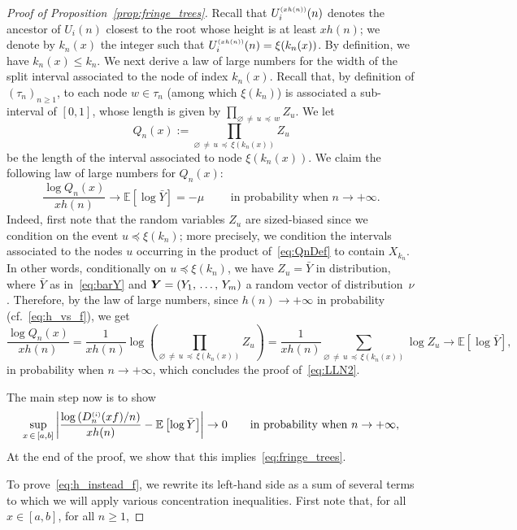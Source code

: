 \documentclass[AHL,Unicode,longabstracts,published]{cedram}
\newcommand{\bs}{\ensuremath{\boldsymbol}}
\newcommand{\sss}{\ensuremath{\scriptscriptstyle}}
\newcommand{\bbE}{\mathbb{E}}
\begin{document}
\begin{proof}[Proof of Proposition~\ref{prop:fringe_trees}]
Recall that $U_i^{\sss (xh(n))}(n)$ denotes the ancestor of $U_i(n)$ closest to the root whose height is at least $xh(n)$; we denote by $k_n(x)$ the integer such that $U_i^{\sss (xh(n))}(n) = \xi(k_n(x))$. By definition, we have $k_n(x)\leq k_n$. We next derive a law of large numbers for the width of the split interval associated to the node of index $k_n(x)$. Recall that, by definition of $(\tau_n)_{n\geq 1}$, to each node $w \in \tau_n$ (among which $\xi(k_n)$) is associated a sub-interval of $[0,1]$, whose length is given by $\prod_{\varnothing\,\neq\,u\,\preccurlyeq\,w} Z_u.$ We let
\begin{equation}\label{eq:QnDef}
Q_n(x) := \prod_{\varnothing\,\neq\,u\,\preccurlyeq\,\xi(k_n(x))} Z_u
\end{equation}
be the length of the interval associated to node $\xi(k_n(x))$. We claim the following law of large numbers for $Q_n(x)$:
\begin{equation}\label{eq:LLN2}
\frac{\log Q_n(x)}{xh(n)}
\to \bbE[\log \bar Y] = -\mu \qquad \text{ in probability when }n\to+\infty.
\end{equation}
Indeed, first note that the random variables $Z_u$ are sized-biased since we condition on the event $u\preccurlyeq \xi(k_n)$; more precisely, we condition the intervals associated to the nodes $u$ occurring in the product of~\eqref{eq:QnDef} to contain $X_{k_n}$. In other words, conditionally on $u\preccurlyeq \xi(k_n)$, we have $Z_u = \bar Y$ in distribution, where $\bar Y$ as in~\eqref{eq:barY} and $\bs Y = (Y_1, \,\ldots,\, Y_m)$ a random vector of distribution~$\nu$. Therefore, by the law of large numbers, since $h(n)\to+\infty$ in probability (cf.~\eqref{eq:h_vs_f}), we get
\[
\frac{\log Q_n(x)}{xh(n)} = \frac1{xh(n)}\log \left(\prod_{\varnothing\,\neq\,u\,\preccurlyeq\,\xi(k_n(x))} Z_u\right) = \frac1{xh(n)}\sum_{\varnothing\,\neq\,u\,\preccurlyeq \,\xi(k_n(x))} \log Z_u
\to \bbE\left[\log \bar Y\right],
\]
in probability when $n\to+\infty$, which concludes the proof of~\eqref{eq:LLN2}.


The main step now is to show
\begin{equation}\label{eq:h_instead_f}
\sup_{x\,\in\,[a,b]} \left|\frac{\log \left(D_n^{\sss (i)}(xf)/n\right)}{xh(n)}- \bbE\left[\log \bar Y\right]\right|\to 0
\qquad\text{in probability when }n\to+\infty,
\end{equation}
At the end of the proof, we show that this implies~\eqref{eq:fringe_trees}.

To prove~\eqref{eq:h_instead_f}, we rewrite its left-hand side as a sum of several terms to which we will apply various concentration inequalities. First note that, for all $x\in [a,b]$, for all $n\geq 1$,


\end{proof}
\end{document}

